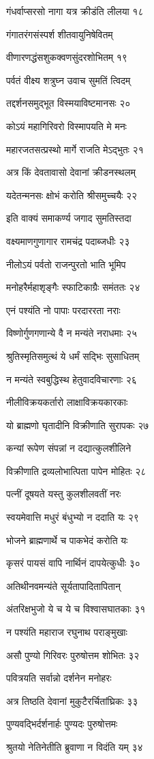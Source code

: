 गंधर्वाप्सरसो नागा यत्र क्रीडंति लीलया १८

गंगातरंगसंस्पर्श शीतवायुनिषेवितम्

वीणारणद्धंसशुकक्वणसुंदरशोभितम् १९

पर्वतं वीक्ष्य शत्रुघ्न उवाच सुमतिं त्विदम्

तद्दर्शनसमुद्भूत विस्मयाविष्टमानसः २०

कोऽयं महागिरिवरो विस्मापयति मे मनः

महारजतसत्प्रस्थो मार्गे राजति मेऽद्भुतः २१

अत्र किं देवतावासो देवानां क्रीडनस्थलम्

यदेतन्मनसः क्षोभं करोति श्रीसमुच्चयैः २२

इति वाक्यं समाकर्ण्य जगाद सुमतिस्तदा

वक्ष्यमाणगुणागार रामचंद्र पदाब्जधीः २३

नीलोऽयं पर्वतो राजन्पुरतो भाति भूमिप

मनोहरैर्महाशृङ्गैः स्फाटिकाग्रैः समंततः २४

एनं पश्यंति नो पापाः परदाररता नराः

विष्णोर्गुणगणान्ये वै न मन्यंते नराधमाः २५

श्रुतिस्मृतिसमुत्थं ये धर्मं सद्भिः सुसाधितम्

न मन्यंते स्वबुद्धिस्थ हेतुवादविचारणाः २६

नीलीविक्रयकर्तारो लाक्षाविक्रयकारकाः

यो ब्राह्मणो घृतादीनि विक्रीणाति सुरापकः २७

कन्यां रूपेण संपन्नां न दद्यात्कुलशीलिने

विक्रीणाति द्रव्यलोभात्पिता पापेन मोहितः २८

पत्नीं दूषयते यस्तु कुलशीलवतीं नरः

स्वयमेवात्ति मधुरं बंधुभ्यो न ददाति यः २९

भोजने ब्राह्मणार्थे च पाकभेदं करोति यः

कृसरं पायसं वापि नार्थिनं दापयेत्कुधीः ३०

अतिथीनवमन्यंते सूर्यतापादितापितान्

अंतरिक्षभुजो ये च ये च विश्वासघातकाः ३१

न पश्यंति महाराज रघुनाथ पराङ्मुखाः

असौ पुण्यो गिरिवरः पुरुषोत्तम शोभितः ३२

पवित्रयति सर्वान्नो दर्शनेन मनोहरः

अत्र तिष्ठति देवानां मुकुटैरर्चितांघ्रिकः ३३

पुण्यवद्भिर्दर्शनार्हः पुण्यदः पुरुषोत्तमः

श्रुतयो नेतिनेतीति ब्रुवाणा न विदंति यम् ३४

